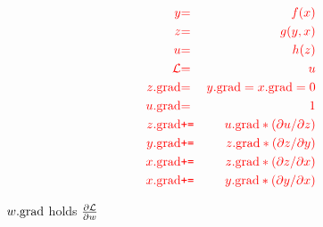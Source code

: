 {
\vspace{-3ex}
\begin{eqnarray*}
  {\color{red} y} & {\color{red} =} & {\color{red} f(x)} \\
  {\color{red} z} & {\color{red} =} & {\color{red} g(y,x)} \\ 
  {\color{red} u} & {\color{red} =} & {\color{red} h(z)} \\
  {\color{red} {\cal L}} &  {\color{red} =} & {\color{red}  u} \\
  {\color{red} z.\mathrm{grad}} & {\color{red} =} & {\color{red} y.\mathrm{grad} = x.\mathrm{grad} = 0} \\
  {\color{red} u.\mathrm{grad}} & {\color{red} =} & {\color{red} 1} \\
  {\color{red} z.\mathrm{grad}} & {\color{red} \mbox{\tt +=}} & {\color{red} u.\mathrm{grad} * ({\partial u}/{\partial z})} \\
  {\color{red} y.\mathrm{grad}} & {\color{red} \mbox{\tt +=}} & {\color{red} z.\mathrm{grad} * ({\partial z}/{\partial y})} \\
  {\color{red} x.\mathrm{grad}} & {\color{red} \mbox{\tt +=}} & {\color{red} z.\mathrm{grad} * ({\partial z}/{\partial x})} \\
  {\color{red} x.\mathrm{grad}} & {\color{red} \mbox{\tt +=}} & {\color{red} y.\mathrm{grad} * ({\partial y}/{\partial x})}
\end{eqnarray*}

\centerline{$w.\mathrm{grad}$ holds $\frac{\partial {\cal L}}{\partial w}$}

}


                

